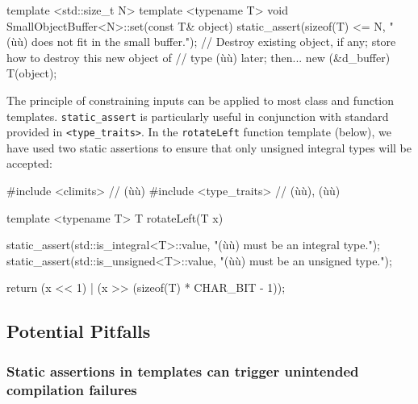 \begin{emcppslisting}[emcppsbatch=e3]
template <std::size_t N>
template <typename T>
void SmallObjectBuffer<N>::set(const T& object)
{
    static_assert(sizeof(T) <= N, "(ù{}ù) does not fit in the small buffer.");
    // Destroy existing object, if any; store how to destroy this new object of
    // type (ù{}ù) later; then...
    new (&d_buffer) T(object);
}
\end{emcppslisting}



The principle of constraining inputs can be applied to most class and
function templates. \lstinline!static_assert! is particularly useful in
conjunction with standard  provided in
\lstinline!<type_traits>!. In the \lstinline!rotateLeft! function template
(below), we have used two static assertions to ensure that only unsigned
integral types will be accepted:

\begin{emcppslisting}
#include <climits>      // (ù{}ù)
#include <type_traits>  // (ù{}ù), (ù{}ù)

template <typename T>
T rotateLeft(T x)
{
    static_assert(std::is_integral<T>::value, "(ù{}ù) must be an integral type.");
    static_assert(std::is_unsigned<T>::value, "(ù{}ù) must be an unsigned type.");

    return (x << 1) | (x >> (sizeof(T) * CHAR_BIT - 1));
}
\end{emcppslisting}


\subsection[Potential Pitfalls]{Potential Pitfalls}\label{static-potential-pitfalls}

\subsubsection[Static assertions in templates can trigger unintended compilation failures]{Static assertions in templates can trigger unintended compilation failures}\label{static-assertions-in-templates-can-trigger-unintended-compilation-failures}

